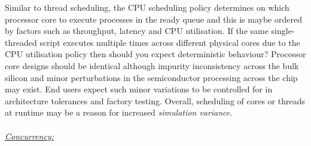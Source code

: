 \documentclass[letterpaper, 10 pt, journal, twoside]{IEEEtran}
\begin{document}
Similar to thread scheduling, the CPU scheduling policy determines on which processor core to execute processes in the ready queue and this is maybe ordered by factors such as throughput, latency and CPU utilisation. If the same single-threaded script executes multiple times across different physical cores due to the CPU utilisation policy then should you expect deterministic behaviour? Processor core designs should be identical although impurity inconsistency across the bulk silicon and minor perturbations in the semiconductor processing across the chip may exist. End users expect such minor variations to be controlled for in architecture tolerances and factory testing. 
%
Overall, scheduling of cores or threads at runtime may be a reason for increased \textit{simulation variance}. 
%
\\\\
\noindent\underline{\textit{Concurrency:}}
\end{document}
